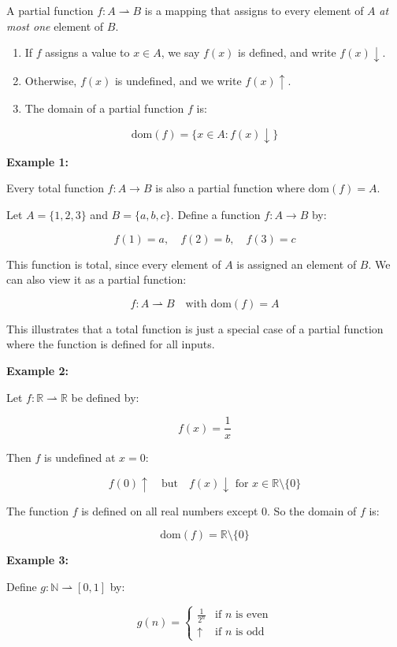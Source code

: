 \documentclass[12pt,a4paper,openany]{article}
\begin{document}
A partial function $f : A \rightharpoonup B$ is a mapping that assigns to every element of $A$ \textit{at most one} element of $B$.

\begin{enumerate}
  \item If $f$ assigns a value to $x \in A$, we say $f(x)$ is defined, and write $f(x) \downarrow$.
  \item Otherwise, $f(x)$ is undefined, and we write $f(x) \uparrow$.
  \item The domain of a partial function $f$ is:
\end{enumerate}


\[\text{dom}(f) = \{x \in A : f(x) \downarrow\}\]

\textbf{Example 1:}

Every total function $f : A \to B$ is also a partial function where $\text{dom}(f) = A$.

Let $A = \{1, 2, 3\}$ and $B = \{a, b, c\}$. Define a function $f : A \to B$ by:

\[f(1) = a, \quad f(2) = b, \quad f(3) = c\]

This function is total, since every element of $A$ is assigned an element of $B$. We can also view it as a partial function:

\[f : A \rightharpoonup B \quad \text{with } \text{dom}(f) = A\]

This illustrates that a total function is just a special case of a partial function where the function is defined for all inputs.

\textbf{Example 2:}

Let $f : \mathbb{R} \rightharpoonup \mathbb{R}$ be defined by:

\[f(x) = \frac{1}{x}\]

Then $f$ is undefined at $x = 0$:

\[f(0) \uparrow \quad \text{but} \quad f(x) \downarrow \text{ for } x \in \mathbb{R} \setminus \{0\}\]

The function $f$ is defined on all real numbers except $0$. So the domain of $f$ is:

\[\text{dom}(f) = \mathbb{R} \setminus \{0\}\]


\textbf{Example 3:}

Define $g : \mathbb{N} \rightharpoonup [0, 1]$ by:

\[g(n) = \begin{cases} \frac{1}{2^n} & \text{if } n \text{ is even} \\ \uparrow & \text{if } n \text{ is odd} \end{cases}\]
\end{document}

